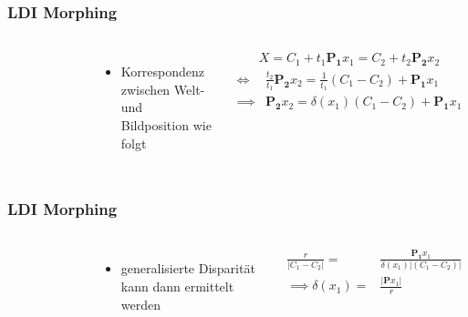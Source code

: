 \documentclass[aspectratio=169]{beamer}
\begin{document}
\begin{frame}
    \frametitle{LDI Morphing}
        \begin{columns}
            \begin{figure}
                \centering
                \resizebox{.9\linewidth}{!}{}%
                \label{fig:ldimorph}
        \end{figure}
        \begin{itemize}
            \item Korrespondenz zwischen Welt- und Bildposition wie folgt
        \end{itemize}
        \begin{align}
            X = C_1 + t_1 \mathbf{P_1} x_1 %
            = C_2 + t_2 \mathbf{P_2} x_2
        \end{align}
        \begin{align}
            \iff{} & \frac{t_2}{t_1} \mathbf{P_2} x_2 %
            = \frac{1}{t_1}(C_1 - C_2) + \mathbf{P_1} x_1 \\
            \implies{} & \mathbf{P_2} x_2 
	        = \delta(x_1) (C_1 - C_2) + \mathbf{P_1} x_1
        \end{align}
    \end{columns}
\end{frame}

\begin{frame}
    \frametitle{LDI Morphing}
        \begin{columns}
            \begin{figure}
                \centering
                \resizebox{.9\linewidth}{!}{}%
                \label{fig:ldimorph}
        \end{figure}
        \begin{itemize}
            \item generalisierte Disparität kann dann ermittelt werden
        \end{itemize}
        \begin{align}
            \frac{r}{\lvert C_1 - C_2 \rvert} = &
            \frac{\mathbf{P_1} x_1}{\delta(x_1) \lvert (C_1 - C_2) \rvert}
            \\ %
            \implies \delta(x_1) =              &
            \frac{\lvert \mathbf{P} x_1 \lvert}{r}
        \end{align}
    \end{columns}
\end{frame}
\end{document}
